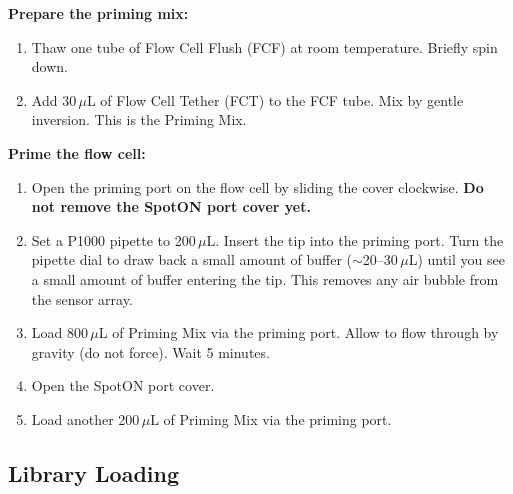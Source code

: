 \begin{protocolbox}[title={Protocol: Flow Cell Priming (R10.4.1)}]
\textbf{Prepare the priming mix:}
\begin{enumerate}[nosep]
  \item Thaw one tube of Flow Cell Flush (FCF) at room temperature. Briefly spin down.
  \item Add 30\,$\mu$L of Flow Cell Tether (FCT) to the FCF tube. Mix by gentle inversion. This is the Priming Mix.
\end{enumerate}

\textbf{Prime the flow cell:}
\begin{enumerate}[nosep, start=3]
  \item Open the priming port on the flow cell by sliding the cover clockwise. \textbf{Do not remove the SpotON port cover yet.}
  \item Set a P1000 pipette to 200\,$\mu$L. Insert the tip into the priming port. Turn the pipette dial to draw back a small amount of buffer ($\sim$20--30\,$\mu$L) until you see a small amount of buffer entering the tip. This removes any air bubble from the sensor array.
  \item Load 800\,$\mu$L of Priming Mix via the priming port. Allow to flow through by gravity (do not force). Wait 5 minutes.
  \item Open the SpotON port cover.
  \item Load another 200\,$\mu$L of Priming Mix via the priming port.
\end{enumerate}
\end{protocolbox}

\subsection{Library Loading}
\label{subsec:protocols:loading}

